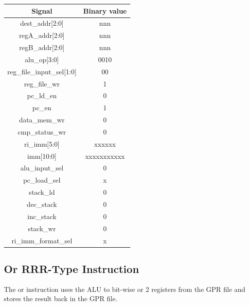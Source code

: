 \documentclass{article}
\begin{document}
\begin{par}
	\begin{center}
		\begin{tabular}{|c|c|}
			\hline 
			\textbf{Signal} & \textbf{Binary value} \\ 
			\hline 
			dest\_addr[2:0] & nnn \\ 
			\hline 
			regA\_addr[2:0] & nnn \\ 
			\hline 
			regB\_addr[2:0] & nnn \\ 
			\hline 
			alu\_op[3:0] & 0010 \\ 
			\hline 
			reg\_file\_input\_sel[1:0] & 00 \\ 
			\hline 
			reg\_file\_wr & 1 \\ 
			\hline 
			pc\_ld\_en & 0 \\ 
			\hline 
			pc\_en & 1 \\ 
			\hline 
			data\_mem\_wr & 0 \\ 
			\hline 
			cmp\_status\_wr & 0 \\ 
			\hline 
			ri\_imm[5:0] & xxxxxx \\ 
			\hline 
			imm[10:0] & xxxxxxxxxxx \\ 
			\hline 
			alu\_input\_sel & 0 \\ 
			\hline 
			pc\_load\_sel & x \\ 
			\hline 
			stack\_ld & 0 \\ 
			\hline 
			dec\_stack & 0 \\ 
			\hline 
			inc\_stack & 0 \\ 
			\hline 
			stack\_wr & 0 \\ 
			\hline 
			ri\_imm\_format\_sel & x \\ 
			\hline 
		\end{tabular} 
	\end{center}

	\newpage
	\subsection{Or RRR-Type Instruction}
	
	The or instruction uses the ALU to bit-wise or 2 registers from the GPR file and stores the result back in the GPR file. \\
	

\end{par}
\end{document}
